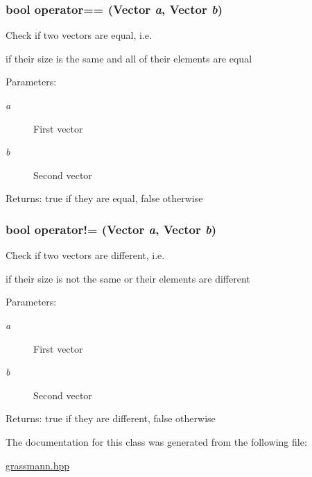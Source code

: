 \hypertarget{classgrassmann_1_1Vector_5d46747ad1ba11f461f4db8945e9bedf}{
\subsubsection[operator==]{\setlength{\rightskip}{0pt plus 5cm}bool operator== ({\bf Vector} {\em a}, \/  {\bf Vector} {\em b})}}
\label{classgrassmann_1_1Vector_5d46747ad1ba11f461f4db8945e9bedf}


Check if two vectors are equal, i.e. 

if their size is the same and all of their elements are equal \begin{Desc}
\item[Parameters:]
\begin{description}
\item[{\em a}]First vector \item[{\em b}]Second vector \end{description}
\end{Desc}
\begin{Desc}
\item[Returns:]true if they are equal, false otherwise \end{Desc}
\hypertarget{classgrassmann_1_1Vector_a73d83b4b0d593774cdbc7874ef72e81}{
\subsubsection[operator"!=]{\setlength{\rightskip}{0pt plus 5cm}bool operator!= ({\bf Vector} {\em a}, \/  {\bf Vector} {\em b})}}
\label{classgrassmann_1_1Vector_a73d83b4b0d593774cdbc7874ef72e81}


Check if two vectors are different, i.e. 

if their size is not the same or their elements are different \begin{Desc}
\item[Parameters:]
\begin{description}
\item[{\em a}]First vector \item[{\em b}]Second vector \end{description}
\end{Desc}
\begin{Desc}
\item[Returns:]true if they are different, false otherwise \end{Desc}


The documentation for this class was generated from the following file:\begin{CompactItemize}
\item 
\hyperlink{grassmann_8hpp}{grassmann.hpp}\end{CompactItemize}
